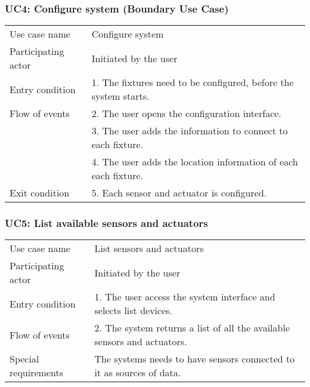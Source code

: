 \subsubsection{UC4: Configure system (Boundary Use Case)} 
\label{sec:notify}
\begin{tabular}{ l p{11cm} }
	\hline                       
	Use case name & Configure system\\
	Participating actor & Initiated by the user\\
	Entry condition & 1. The fixtures need to be configured, before the system starts. \\
	Flow of events  & 2. The user opens the configuration interface.\\
							  & 3. The user adds the information to connect to each fixture.\\
							& 4. The user adds the location information of each each fixture.\\
	Exit condition & 5. Each sensor and actuator is configured. \\
	\hline
\end{tabular}

\subsubsection{UC5: List available sensors and actuators}
\label{sec:notify}
\begin{tabular}{ l p{11cm} }
	\hline                       
	Use case name & List sensors and actuators\\
	Participating actor & Initiated by the user\\
	Entry condition & 1. The user access the system interface and selects list devices. \\
	Flow of events & 2. The system returns a list of all the available sensors and actuators. \\
	Special requirements & The systems needs to have sensors connected to it as sources of data.\\
	\hline
\end{tabular}

